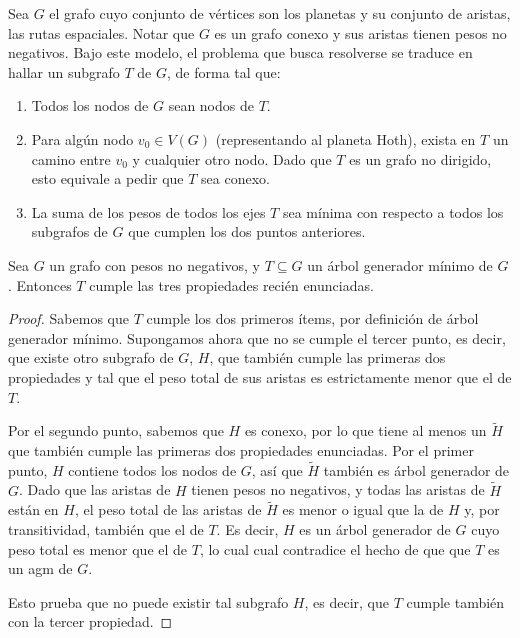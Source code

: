     Sea $G$ el grafo cuyo conjunto de vértices son los planetas y su conjunto
    de aristas, las rutas espaciales. Notar que $G$ es un grafo conexo y
    sus aristas tienen pesos no negativos. Bajo este modelo, el problema que
    busca resolverse se traduce en hallar un subgrafo $T$ de $G$, de forma tal
    que:
    \begin{enumerate}
        \item Todos los nodos de $G$ sean nodos de $T$.
        \item Para algún nodo $v_0 \in V(G)$ (representando al planeta Hoth),
        exista en $T$ un camino entre $v_0$ y cualquier otro nodo. Dado que
        $T$ es un grafo no dirigido, esto equivale a pedir que $T$ sea conexo.
        \item La suma de los pesos de todos los ejes $T$ sea mínima con
        respecto a todos los subgrafos de $G$ que cumplen los dos puntos
        anteriores.
    \end{enumerate}

    \begin{lema}
    Sea $G$ un grafo con pesos no negativos, y $T \subseteq G$ un árbol
    generador mínimo de $G$. Entonces $T$ cumple las tres propiedades recién
    enunciadas.
    \end{lema}
    \begin{proof}
    Sabemos que $T$ cumple los dos primeros ítems, por definición de árbol
    generador mínimo.
    Supongamos ahora que no se cumple el tercer punto, es decir, que existe
    otro subgrafo de $G$, $H$, que también cumple las primeras dos propiedades
    y tal que el peso total de sus aristas es estrictamente menor que el de
    $T$.

    Por el segundo punto, sabemos que $H$ es conexo, por lo que tiene al menos
    un  $\tilde{H}$ que también cumple las primeras dos
    propiedades enunciadas. Por el primer punto, $H$ contiene todos los
    nodos de $G$, así que $\tilde{H}$ también es árbol generador de $G$.
    Dado que las aristas de $H$ tienen pesos no negativos, y todas las aristas
    de $\tilde{H}$ están en $H$, el peso total de las aristas de $\tilde{H}$
    es menor o igual que la de $H$ y, por transitividad, también que el de
    $T$. Es decir, $H$ es un árbol generador de $G$ cuyo peso total es menor
    que el de $T$, lo cual cual contradice el hecho de que que $T$ es un \acr
    {agm} de $G$.

    Esto prueba que no puede existir tal subgrafo $H$, es decir, que $T$
    cumple también con la tercer propiedad.
    \end{proof}

